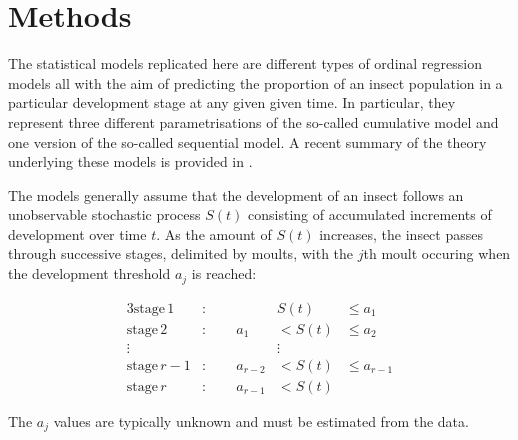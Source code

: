\section{Methods}
The statistical models replicated here are different types of ordinal regression models \citep{agresti2010analysis} all with the aim of predicting the proportion of an insect population in a particular development stage at any given given time. 
In particular, they represent three different parametrisations of the so-called cumulative model and one version of the so-called sequential model. 
A recent summary of the theory underlying these models is provided in \citep{burkner2019ordinal}.

The models generally assume that the development of an insect follows an unobservable stochastic process $S(t)$ consisting of accumulated increments of development over time $t$. 
As the amount of $S(t)$ increases, the insect passes through successive stages, delimited by moults, with the $j$th moult occuring when the development threshold $a_j$ is reached:

\begin{alignat*}{3}
  \mathrm{stage}\,1&:\qquad {}&   S(t) & \leq a_1 \\
  \mathrm{stage}\,2&:\qquad  a_1&< S(t) & \leq a_2 \\
  \vdots & &\vdots \\
  \mathrm{stage}\,r-1&:\qquad  a_{r-2}&< S(t) & \leq a_{r-1} \\
  \mathrm{stage}\,r&:\qquad  a_{r-1}&< S(t) 
\end{alignat*}

The $a_j$ values are typically unknown and must be estimated from the data.

